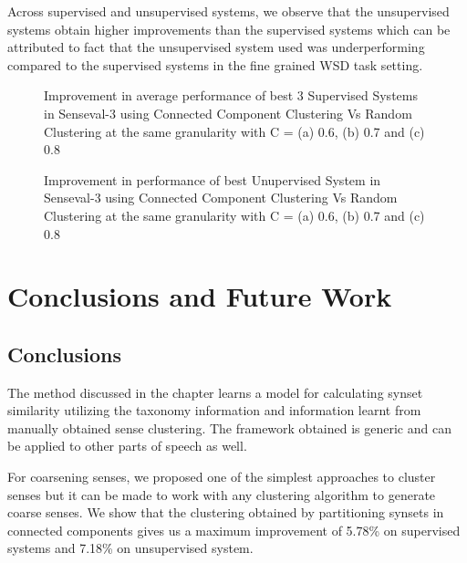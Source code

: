 Across supervised and unsupervised systems, we observe that the unsupervised systems obtain higher improvements than the supervised systems which can be attributed to fact that the unsupervised system used was underperforming compared to the supervised systems in the fine grained WSD task setting.

\begin{figure}
\centering
{}
\caption{Improvement in average performance of best 3 Supervised Systems in Senseval-3 using Connected Component Clustering Vs Random Clustering at the same granularity with C = (a) 0.6, (b) 0.7 and (c) 0.8}
\label{fig:supervisedSystemsImprovement}
\end{figure}

\begin{figure}
\centering
{}
\caption{Improvement in performance of best Unupervised System in Senseval-3 using Connected Component Clustering Vs Random Clustering at the same granularity with C = (a) 0.6, (b) 0.7 and (c) 0.8}
\label{fig:unsupervisedSystemsImprovement}
\end{figure}

\section{Conclusions and Future Work}

\subsection{Conclusions}
The method discussed in the chapter learns a model for calculating synset similarity utilizing the taxonomy information and information learnt from manually obtained sense clustering. The framework obtained is generic and can be applied to other parts of speech as well.

For coarsening senses, we proposed one of the simplest approaches to cluster senses but it can be made to work with any clustering algorithm to generate coarse senses. We show that the clustering obtained by partitioning synsets in  connected components gives us a maximum improvement of 5.78\% on supervised systems and 7.18\% on unsupervised system.

